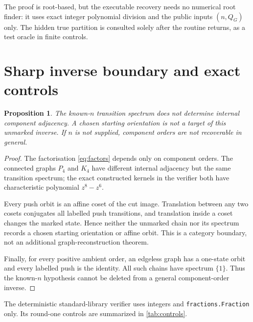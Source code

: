 \documentclass[10pt,a4paper]{amsart}
\newtheorem{proposition}[theorem]{Proposition}
\theoremstyle{remark}
\begin{document}
The proof is root-based, but the executable recovery needs no numerical root
finder: it uses exact integer polynomial division and the public inputs
$(n,Q_G)$ only.  The hidden true partition is consulted solely after the
routine returns, as a test oracle in finite controls.

\section{Sharp inverse boundary and exact controls}\label{sec:boundary}

\begin{proposition}\label{prop:boundary}
The known-$n$ transition spectrum does not determine internal component
adjacency.  A chosen starting orientation is not a target of this unmarked
inverse.  If $n$ is not supplied, component orders are not recoverable in
general.
\end{proposition}

\begin{proof}
The factorisation \eqref{eq:factors} depends only on component orders.  The
connected graphs $P_4$ and $K_4$ have different internal adjacency but the
same transition spectrum; the exact constructed kernels in the verifier both
have characteristic polynomial $z^8-z^6$.

Every push orbit is an affine coset of the cut image.  Translation between any
two cosets conjugates all labelled push transitions, and translation inside a
coset changes the marked state.  Hence neither the unmarked chain nor its
spectrum records a chosen starting orientation or affine orbit.  This is a
category boundary, not an additional graph-reconstruction theorem.

Finally, for every positive ambient order, an edgeless graph has a one-state
orbit and every labelled push is the identity.  All such chains have spectrum
$\{1\}$.  Thus the known-$n$ hypothesis cannot be deleted from a general
component-order inverse.
\end{proof}

The deterministic standard-library verifier uses integers and
\texttt{fractions.Fraction} only.  Its round-one controls are summarized in
\cref{tab:controls}.
\end{document}
